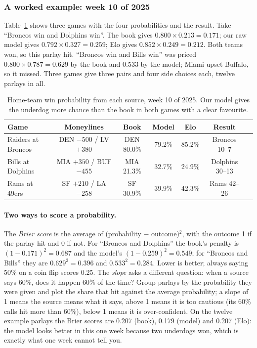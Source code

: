 \subsubsection{A worked example: week 10 of 2025}

Table~\ref{tab:parlay_example} shows three games with the four probabilities and the result. Take ``Broncos win and Dolphins win''. The book gives $0.800\times0.213 = 0.171$; our raw model gives $0.792\times0.327 = 0.259$; Elo gives $0.852\times0.249 = 0.212$. Both teams won, so this parlay hit. ``Broncos win and Bills win'' was priced $0.800\times0.787 = 0.629$ by the book and $0.533$ by the model; Miami upset Buffalo, so it missed. Three games give three pairs and four side choices each, twelve parlays in all.

\begin{table}[H]
\centering
\small
\begin{tabular}{lcccccl}
\toprule
\textbf{Game} & \textbf{Moneylines} & \textbf{Book} & \textbf{Model} & \textbf{Elo} & \textbf{Result} \\
\midrule
Raiders at Broncos & DEN $-500$ / LV $+380$ & DEN 80.0\% & 79.2\% & 85.2\% & Broncos 10--7 \\
Bills at Dolphins & MIA $+350$ / BUF $-455$ & MIA 21.3\% & 32.7\% & 24.9\% & Dolphins 30--13 \\
Rams at 49ers & SF $+210$ / LA $-258$ & SF 30.9\% & 39.9\% & 42.3\% & Rams 42--26 \\
\bottomrule
\end{tabular}
\caption{Home-team win probability from each source, week 10 of 2025. Our model gives the underdog more chance than the book in both games with a clear favourite.}
\label{tab:parlay_example}
\end{table}

\paragraph{Two ways to score a probability.} The \emph{Brier score} is the average of (probability $-$ outcome)$^2$, with the outcome 1 if the parlay hit and 0 if not. For ``Broncos and Dolphins'' the book's penalty is $(1-0.171)^2 = 0.687$ and the model's $(1-0.259)^2 = 0.549$; for ``Broncos and Bills'' they are $0.629^2 = 0.396$ and $0.533^2 = 0.284$. Lower is better; always saying 50\% on a coin flip scores 0.25. The \emph{slope} asks a different question: when a source says 60\%, does it happen 60\% of the time? Group parlays by the probability they were given and plot the share that hit against the average probability; a slope of 1 means the source means what it says, above 1 means it is too cautious (its 60\% calls hit more than 60\%), below 1 means it is over-confident. On the twelve example parlays the Brier scores are 0.207 (book), 0.179 (model) and 0.207 (Elo): the model looks better in this one week because two underdogs won, which is exactly what one week cannot tell you.

